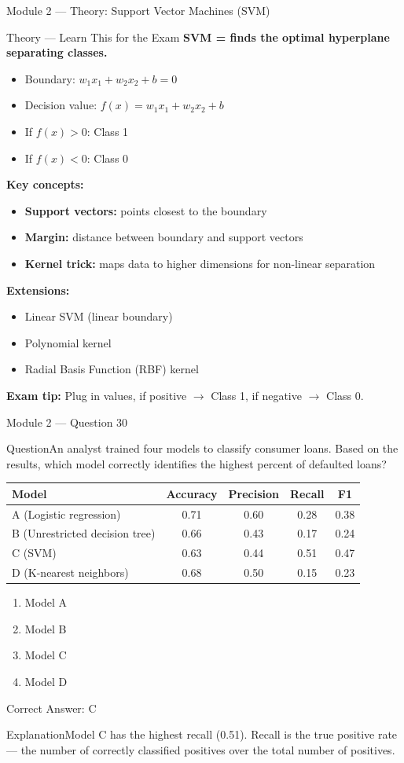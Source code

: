 \documentclass[aspectratio=169,10pt]{beamer}
\newcommand{\question}[1]{\begin{block}{Question}#1\end{block}}
\newcommand{\options}[4]{%
	\begin{enumerate}[label=\Alph*.,leftmargin=*]
		\item #1
		\item #2
		\item #3
		\item #4
	\end{enumerate}
}
\newcommand{\answerbox}[1]{\begin{exampleblock}{Correct Answer: #1}\end{exampleblock}}
\newcommand{\explain}[1]{\begin{block}{Explanation}#1\end{block}}
\newcommand{\theory}[1]{%
	\begin{block}{Theory --- Learn This for the Exam}
		\small #1
	\end{block}
}
\begin{document}
	\begin{frame}{Module 2 --- Theory: Support Vector Machines (SVM)}
		\theory{
			\textbf{SVM = finds the optimal hyperplane separating classes.}
			\begin{itemize}
				\item Boundary: $w_1x_1 + w_2x_2 + b = 0$
				\item Decision value: $f(x) = w_1x_1 + w_2x_2 + b$
				\item If $f(x) > 0$: Class 1
				\item If $f(x) < 0$: Class 0
			\end{itemize}
			\textbf{Key concepts:}
			\begin{itemize}
				\item \textbf{Support vectors:} points closest to the boundary
				\item \textbf{Margin:} distance between boundary and support vectors
				\item \textbf{Kernel trick:} maps data to higher dimensions for non-linear separation
			\end{itemize}
			\textbf{Extensions:}
			\begin{itemize}
				\item Linear SVM (linear boundary)
				\item Polynomial kernel
				\item Radial Basis Function (RBF) kernel
			\end{itemize}
			\textbf{Exam tip:} Plug in values, if positive $\rightarrow$ Class 1, if negative $\rightarrow$ Class 0.
		}
	\end{frame}
	
	\begin{frame}{Module 2 --- Question 30}
		\question{An analyst trained four models to classify consumer loans. Based on the results, which model correctly identifies the highest percent of defaulted loans?}
		\begin{center}
			\small
			\begin{tabular}{@{}lcccc@{}}
				\toprule
				Model & Accuracy & Precision & Recall & F1 \\
				\midrule
				A (Logistic regression) & 0.71 & 0.60 & 0.28 & 0.38 \\
				B (Unrestricted decision tree) & 0.66 & 0.43 & 0.17 & 0.24 \\
				C (SVM) & 0.63 & 0.44 & 0.51 & 0.47 \\
				D (K-nearest neighbors) & 0.68 & 0.50 & 0.15 & 0.23 \\
				\bottomrule
			\end{tabular}
		\end{center}
		\options{Model A}{Model B}{Model C}{Model D}
		\answerbox{C}
		\explain{Model C has the highest recall (0.51). Recall is the true positive rate --- the number of correctly classified positives over the total number of positives.}
	\end{frame}
	
\end{document}
